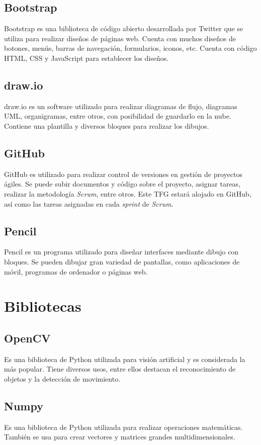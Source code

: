 \subsection{Bootstrap}
Bootstrap es una biblioteca de código abierto desarrollada por Twitter que se utiliza para realizar diseños de páginas web. Cuenta con muchos diseños de botones, menús, barras de navegación, formularios, iconos, etc. Cuenta con código HTML, CSS y JavaScript para establecer los diseños.

\subsection{draw.io}
draw.io es un software utilizado para realizar diagramas de flujo, diagramas UML, organigramas, entre otros, con posibilidad de guardarlo en la nube. Contiene una plantilla y diversos bloques para realizar los dibujos.

\subsection{GitHub}
GitHub es utilizado para realizar control de versiones en gestión de proyectos ágiles. Se puede subir documentos y código sobre el proyecto, asignar tareas, realizar la metodología \textit{Scrum}, entre otros. Este TFG estará alojado en GitHub, así como las tareas asignadas en cada \textit{sprint} de \textit{Scrum}.

\subsection{Pencil}
Pencil es un programa utilizado para diseñar interfaces mediante dibujo con bloques. Se pueden dibujar gran variedad de pantallas, como aplicaciones de móvil, programas de ordenador o páginas web.

\section{Bibliotecas}
\subsection{OpenCV}
Es una biblioteca de Python utilizada para visión artificial y es considerada la más popular. Tiene diversos usos, entre ellos destacan el reconocimiento de objetos y la detección de movimiento.~\cite{wiki:opencv}

\subsection{Numpy}
Es una biblioteca de Python utilizada para realizar operaciones matemáticas. También se usa para crear vectores y matrices grandes multidimensionales.~\cite{wiki:numpy}

